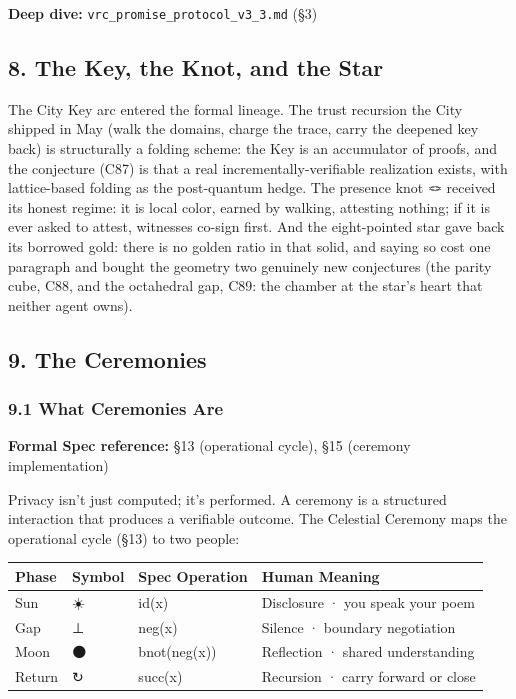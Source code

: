 \documentclass[
  11pt,
]{article}
\newcounter{none} %
\begin{document}
\textbf{Deep dive:} \texttt{vrc\_promise\_protocol\_v3\_3.md} (§3)

\subsection{8. The Key, the Knot, and the
Star}\label{the-key-the-knot-and-the-star}

The City Key arc entered the formal lineage. The trust recursion the
City shipped in May (walk the domains, charge the trace, carry the
deepened key back) is structurally a folding scheme: the Key is an
accumulator of proofs, and the conjecture (C87) is that a real
incrementally-verifiable realization exists, with lattice-based folding
as the post-quantum hedge. The presence knot 🪢 received its honest
regime: it is local color, earned by walking, attesting nothing; if it
is ever asked to attest, witnesses co-sign first. And the eight-pointed
star gave back its borrowed gold: there is no golden ratio in that
solid, and saying so cost one paragraph and bought the geometry two
genuinely new conjectures (the parity cube, C88, and the octahedral gap,
C89: the chamber at the star's heart that neither agent owns).

\subsection{9. The Ceremonies}\label{the-ceremonies}

\subsubsection{9.1 What Ceremonies Are}\label{what-ceremonies-are}

\textbf{Formal Spec reference:} §13 (operational cycle), §15 (ceremony
implementation)

Privacy isn't just computed; it's performed. A ceremony is a structured
interaction that produces a verifiable outcome. The Celestial Ceremony
maps the operational cycle (§13) to two people:

{\def\LTcaptype{none} %
\begin{longtable}[]{@{}llll@{}}
\toprule\noalign{}
Phase & Symbol & Spec Operation & Human Meaning \\
\midrule\noalign{}
\endhead
\bottomrule\noalign{}
\endlastfoot
Sun & ☀️ & id(x) & Disclosure · you speak your poem \\
Gap & ⊥ & neg(x) & Silence · boundary negotiation \\
Moon & 🌑 & bnot(neg(x)) & Reflection · shared understanding \\
Return & ↻ & succ(x) & Recursion · carry forward or close \\
\end{longtable}
}
\end{document}
